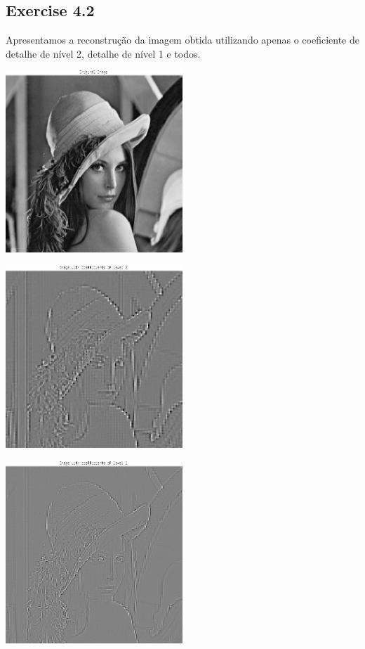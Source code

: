 \documentclass[a4paper]{article}
\begin{document}
\subsection{Exercise 4.2}
\indent \indent Apresentamos a reconstrução da imagem obtida utilizando apenas o coeficiente de detalhe de nível 2, detalhe de nível 1 e todos.
\begin{center}
	\includegraphics[width=0.50\textwidth]{images/ex_4_2_original.png}
\end{center}
\begin{center}
	\includegraphics[width=0.50\textwidth]{images/ex_4_2_coef_l2.png}
\end{center}
\begin{center}
	\includegraphics[width=0.50\textwidth]{images/ex_4_2_coef_l1.png}
\end{center}
\end{document}
